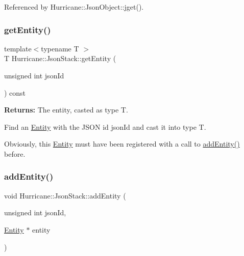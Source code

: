Referenced by Hurricane\+::\+Json\+Object\+::jget().

\mbox{\label{classHurricane_1_1JsonStack_aadbd70d7d19d2eb0a6c9c86ca1583c76}} 
\subsubsection{\texorpdfstring{get\+Entity()}{getEntity()}}
{\footnotesize\ttfamily template$<$typename T $>$ \\
T Hurricane\+::\+Json\+Stack\+::get\+Entity (\begin{DoxyParamCaption}\item[{unsigned int}]{json\+Id }\end{DoxyParamCaption}) const\hspace{0.3cm}{\ttfamily [inline]}}

{\bfseries Returns\+:} The entity, casted as type {\ttfamily T}.

Find an \mbox{\hyperlink{classHurricane_1_1Entity}{Entity}} with the J\+S\+ON id {\ttfamily json\+Id} and cast it into type {\ttfamily T}.

Obviously, this \mbox{\hyperlink{classHurricane_1_1Entity}{Entity}} must have been registered with a call to \mbox{\hyperlink{classHurricane_1_1JsonStack_a421fdf4a3bab01d75f0aab292cc574d0}{add\+Entity()}} before. \mbox{\label{classHurricane_1_1JsonStack_a421fdf4a3bab01d75f0aab292cc574d0}} 
\subsubsection{\texorpdfstring{add\+Entity()}{addEntity()}}
{\footnotesize\ttfamily void Hurricane\+::\+Json\+Stack\+::add\+Entity (\begin{DoxyParamCaption}\item[{unsigned int}]{json\+Id,  }\item[{\mbox{\hyperlink{classHurricane_1_1Entity}{Entity}} $\ast$}]{entity }\end{DoxyParamCaption})}


